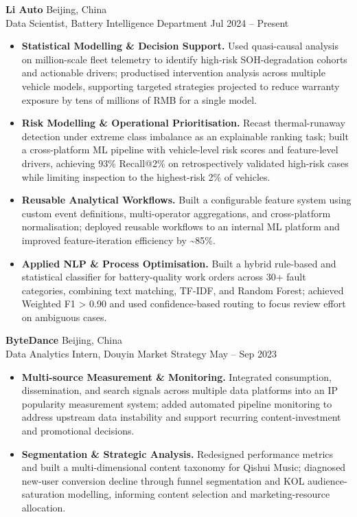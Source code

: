 \documentclass[a4paper,10pt]{article}
\begin{document}
\noindent\textbf{Li Auto} \hfill Beijing, China\\
Data Scientist, Battery Intelligence Department \hfill Jul 2024 -- Present
\begin{itemize}
    \item \textbf{Statistical Modelling \& Decision Support.} Used quasi-causal analysis on million-scale fleet telemetry to identify high-risk SOH-degradation cohorts and actionable drivers; productised intervention analysis across multiple vehicle models, supporting targeted strategies projected to reduce warranty exposure by tens of millions of RMB for a single model.

    \item \textbf{Risk Modelling \& Operational Prioritisation.} Recast thermal-runaway detection under extreme class imbalance as an explainable ranking task; built a cross-platform ML pipeline with vehicle-level risk scores and feature-level drivers, achieving 93\% Recall@2\% on retrospectively validated high-risk cases while limiting inspection to the highest-risk 2\% of vehicles.

    \item \textbf{Reusable Analytical Workflows.} Built a configurable feature system using custom event definitions, multi-operator aggregations, and cross-platform normalisation; deployed reusable workflows to an internal ML platform and improved feature-iteration efficiency by \textasciitilde85\%.

    \item \textbf{Applied NLP \& Process Optimisation.} Built a hybrid rule-based and statistical classifier for battery-quality work orders across 30+ fault categories, combining text matching, TF-IDF, and Random Forest; achieved Weighted F1 > 0.90 and used confidence-based routing to focus review effort on ambiguous cases.
\end{itemize}

\vspace{2pt}
\noindent\textbf{ByteDance} \hfill Beijing, China\\
Data Analytics Intern, Douyin Market Strategy \hfill May -- Sep 2023
\begin{itemize}
    \item \textbf{Multi-source Measurement \& Monitoring.} Integrated consumption, dissemination, and search signals across multiple data platforms into an IP popularity measurement system; added automated pipeline monitoring to address upstream data instability and support recurring content-investment and promotional decisions.

    \item \textbf{Segmentation \& Strategic Analysis.} Redesigned performance metrics and built a multi-dimensional content taxonomy for Qishui Music; diagnosed new-user conversion decline through funnel segmentation and KOL audience-saturation modelling, informing content selection and marketing-resource allocation.
\end{itemize}
\end{document}
